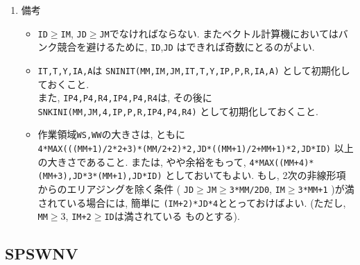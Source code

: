 \documentclass[a4j,fleqn]{jarticle}
\begin{document}
\begin{enumerate}
\item 備考

\begin{itemize}

\item {\tt ID}$\ge${\tt IM}, {\tt JD}$\ge${\tt JM}でなければならない.
   またベクトル計算機においてはバンク競合を避けるために, {\tt ID},{\tt JD}
   はできれば奇数にとるのがよい.

\item {\tt IT,T,Y,IA,A}は 
      {\tt SNINIT(MM,IM,JM,IT,T,Y,IP,P,R,IA,A)} として初期化しておくこと.\\
       また, {\tt IP4,P4,R4,IP4,P4,R4}は, その後に\\
      {\tt SNKINI(MM,JM,4,IP,P,R,IP4,P4,R4)} として初期化しておくこと.
      

\item 作業領域{\tt WS,WW}の大きさは, ともに\\
     {\tt 4*MAX(((MM+1)/2*2+3)*(MM/2+2)*2,JD*((MM+1)/2+MM+1)*2,JD*ID)}
    以上の大きさであること. または, やや余裕をもって,
     {\tt 4*MAX((MM+4)*(MM+3),JD*3*(MM+1),JD*ID)}
    としておいてもよい. もし, 2次の非線形項からのエリアジングを除く条件
     ( {\tt JD}$\ge${\tt JM}$\ge${\tt 3*MM/2D0}, 
      {\tt IM}$\ge${\tt 3*MM+1} )が満されている場合には, 簡単に
      {\tt (IM+2)*JD*4}ととっておけばよい.
     (ただし, {\tt MM}$\ge 3$, {\tt IM+2}$\ge${\tt ID}は満されている
    ものとする).

 \end{itemize}

\end{enumerate}


\subsection{SPSWNV}
\end{document}
